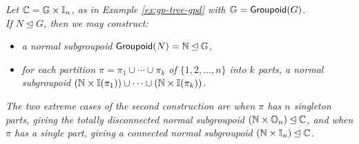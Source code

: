 \begin{example}
\emph{Let $\mathbb{C} = \mathbb{G} \times \mathbb{I}_n$, as in Example \ref{ex:gp-tree-gpd} 
with $\mathbb{G} = {\sf Groupoid}(G)$. \\
If $N \unlhd G$, then we may construct:} 
\begin{itemize}   
\item
\emph{a normal subgroupoid ${\sf Groupoid}(N) = \mathbb{N} \unlhd \mathbb{G}$,}
\item
\emph{for each partition $\pi = \pi_1 \cup \cdots \cup \pi_k$ 
of $\{1,2,\ldots,n\}$ into $k$ parts, a normal subgroupoid 
$(\mathbb{N} \times \mathbb{I}(\pi_1)) \cup \cdots \cup (\mathbb{N} \times \mathbb{I}(\pi_k))$.} 
\end{itemize}  
\emph{The two extreme cases of the second construction 
are when $\pi$ has $n$ singleton parts, 
giving the totally disconnected normal subgroupoid 
$(\mathbb{N} \times \mathbb{O}_n) \unlhd \mathbb{C}$, 
and when $\pi$ has a single part, 
giving a connected normal subgroupoid $(\mathbb{N} \times \mathbb{I}_n) \unlhd \mathbb{C}$.} 
\end{example}

